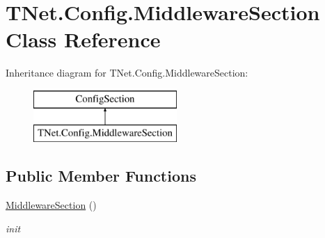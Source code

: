 \hypertarget{class_t_net_1_1_config_1_1_middleware_section}{}\section{T\+Net.\+Config.\+Middleware\+Section Class Reference}
\label{class_t_net_1_1_config_1_1_middleware_section}


 


Inheritance diagram for T\+Net.\+Config.\+Middleware\+Section\+:\begin{figure}[H]
\begin{center}
\leavevmode
\includegraphics[height=2.000000cm]{class_t_net_1_1_config_1_1_middleware_section}
\end{center}
\end{figure}
\subsection*{Public Member Functions}
\begin{DoxyCompactItemize}
\item 
\mbox{\hyperlink{class_t_net_1_1_config_1_1_middleware_section_a4ddc3cbb3cb05830df960bc20a6ff5a1}{Middleware\+Section}} ()
\begin{DoxyCompactList}\small\item\em init \end{DoxyCompactList}\end{DoxyCompactItemize}
